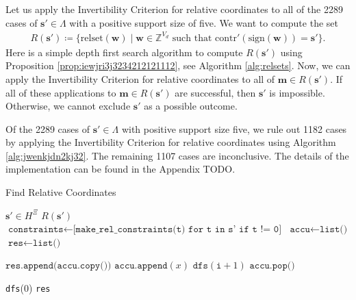 Let us apply the Invertibility Criterion for relative coordinates to all of the 2289 cases of \( \mathbf{s}' \in \Lambda \) with a positive support size of five. We want to compute the set
\begin{align*}
    R(\mathbf{s}') \coloneqq \{ \mathrm{relset}(\mathbf{w}) \mid  \mathbf{w} \in \mathbb Z^{V_d} \text{ such that } \mathrm{contr}'(\mathrm{sign}(\mathbf{w})) = \mathbf{s}' \}.
\end{align*}
Here is a simple depth first search algorithm to compute \( R(\mathbf{s}') \) using Proposition \ref{prop:iewjri3j3234212121112}, see Algorithm \ref{alg:relsets}. Now, we can apply the Invertibility Criterion for relative coordinates to all of \( \mathbf{m} \in R(\mathbf{s}') \). If all of these applications to \( \mathbf{m} \in R(\mathbf{s}') \) are successful, then \( \mathbf{s}' \) is impossible. Otherwise, we cannot exclude \( \mathbf{s}' \) as a possible outcome. 

Of the 2289 cases of \( \mathbf{s}' \in \Lambda \) with positive support size five, we rule out 1182 cases by applying the Invertibility Criterion for relative coordinates using Algorithm \ref{alg:jwenkjdn2kj32}. The remaining 1107 cases are inconclusive. The details of the implementation can be found in the Appendix TODO.

\begin{algorithm}[H]
\caption{Find Relative Coordinates}
\label{alg:relsets}
\begin{algorithmic}[1]
\Require $\mathbf{s}' \in H^{\Xi}$
\Ensure $R(\mathbf{s}')$
    \State $\texttt{constraints} \gets \texttt{[make\_rel\_constraints(t) for t in s' if t != 0]}$
    \State $\texttt{accu} \gets \texttt{list()}$ 
    \State $\texttt{res} \gets \texttt{list()}$ 
    
            \State $\texttt{res.append(accu.copy())}$
            \State \Return
        \EndIf
            \State $\texttt{accu.append}(x)$
            \State $\texttt{dfs}(\texttt{i} + 1)$
            \State $\texttt{accu.pop()}$
        \EndFor
    \EndFunction

    \State \texttt{dfs}(0)
    \State \Return \texttt{res}
\EndFunction
\end{algorithmic}
\end{algorithm}

